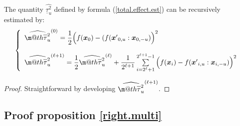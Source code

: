 \documentclass[]{elsarticle}
\makeatletter
\theoremstyle{definition}
\newcommand{\bvec}[1]{\boldsymbol{#1}}
\newcommand{\vx}{\bvec{x}}
\newcommand*{\ov}[1]{
  \m@th\overline{\mbox{#1}\raisebox{2mm}{}}
}
\makeatother
\begin{document}
The quantity $\widehat{\underline{\tau}_u^2}$ defined by formula (\ref{total.effect.est}) can be recursively estimated by:
\begin{equation}
\left\lbrace \begin{array}{l}
\widehat{\ov{$\tau$}_u^2}^{(0)}= \dfrac{1}{2} \Big{(} f(\vx_0)-(f({\vx'}_{0,u}:\vx_{0,-u}) \Big{)}^2 \\
\\
\widehat{\ov{$\tau$}_u^2}^{(\ell+1)} = \dfrac{1}{2} \widehat{\ov{$\tau$}_u^2}^{(\ell)} + \dfrac{1}{2^{\ell+1}} \sum \limits_{i=2^{\ell}+1}^{2^{\ell+1}-1} \Big{(}f(\vx_i)- f({\vx'}_{i,u}:\vx_{i,-u})\Big{)}^2 
\end{array}\right.
\label{total.effect.est.rec}
\end{equation}
\begin{proof}
Straightforward by developing $\widehat{\ov{$\tau$}_u^2}^{(\ell+1)}$.
\end{proof}

\subsection{Proof proposition \ref{right.multi}}
\label{proof.prop}
\end{document}

